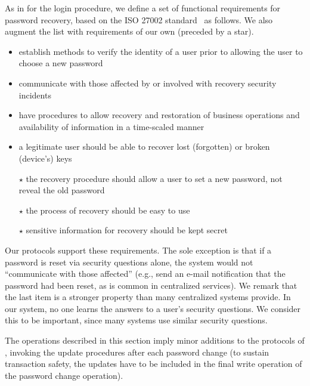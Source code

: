 As in  for the login procedure, we  define a set of functional
requirements for password recovery, based on the ISO 27002 standard~\cite{iso27002} as follows. We
also augment the list with requirements of our own (preceded by a star).

\begin{itemize}
	\item establish methods to verify the identity of a user prior to allowing the user to choose a new password
	\item communicate with those affected by or involved with recovery security incidents 
	\item have procedures to allow recovery and restoration of business operations and availability of information in a time-scaled manner 
	\item a legitimate user should be able to recover lost (forgotten) or broken (device's) keys
	\item[$\star$] the recovery procedure should allow a user to set a new password, not reveal the old password
	\item[$\star$] the process of recovery should be easy to use
	\item[$\star$] sensitive information for recovery should be kept secret
\end{itemize}
Our protocols support these requirements. The sole exception is that if a
password is reset via security questions alone, the system would not
``communicate with those affected'' (e.g., send an e-mail notification that
the password had been reset, as is common in centralized services).
We remark that the last item is a stronger property than many
centralized systems provide. In our system, no one learns the
answers to a user's security questions. We consider this to be
important, since many systems use similar security questions.

The operations described in this section imply minor additions to the protocols
of , \ie invoking the update procedures after each password change
(to sustain transaction safety, the updates have to be included in the final write operation of
the password change operation).


